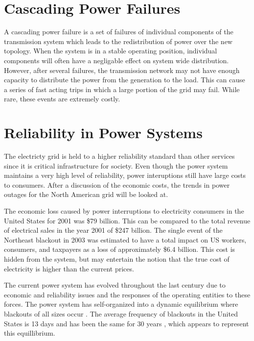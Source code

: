 \section{Cascading Power Failures}
A cascading power failure is a set of failures of individual components of the transmission system which leads to the redistribution of power over the new topology.
 When the system is in a stable operating position, individual components will often have a negligable effect on system wide distribution.  However, after several failures, the transmission network may not have enough capacity to distribute the power from the generation to the load.  This can cause a series of fast acting trips in which a large portion of the grid may fail.  While rare, these events are extremely costly.

 

\section{Reliability in Power Systems}
The electricty grid is held to a higher reliability standard than other services since it is critical infrastructure for society.  Even though the power system maintains a very high level of reliability, power interuptions still have large costs to consumers.  After a discussion of the economic costs, the trends in power outages for the North American grid will be looked at.

The economic loss caused by power interruptions to electricity consumers in the United States for 2001 was \$79 billion.\cite{lacommare_2006}  This can be compared to the total revenue of electrical sales in the year 2001 of \$247 billion.  The single event of the Northeast blackout in 2003 was estimated to have a total impact on US workers, consumers, and taxpayers as a loss of approximately \$6.4 billion.\cite{anderson_2003}  This cost is hidden from the system, but may entertain the notion that the true cost of electricity is higher than the current prices.  

The current power system has evolved throughout the last century due to economic and reliability issues and the responses of the operating entities to these forces.  The power system has self-organized into a dynamic equilibrium where blackouts of all sizes occur \cite{dobson_2001}.  The average frequency of blackouts in the United States is 13 days and has been the same for 30 years \cite{carreras_2004}, which appears to represent this equillibrium.  
	
